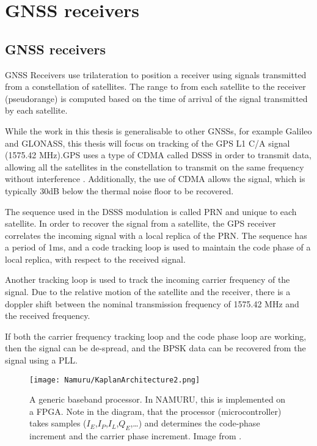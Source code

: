 \chapter{GNSS receivers}\label{ch:GNSSReceivers}

\section{\ac{GNSS} receivers}

\ac{GNSS} Receivers use trilateration to position a receiver using signals transmitted from a constellation of satellites. The range to from each satellite to the receiver (pseudorange) is computed based on the time of arrival of the signal transmitted by each satellite. 

While the work in this thesis is generalisable to other \ac{GNSS}s, for example Galileo and GLONASS, this thesis will focus on tracking of the GPS L1 \ac{C/A} signal (1575.42 MHz).\ac{GPS} uses a type of \ac{CDMA} called \ac{DSSS} in order to transmit data, allowing all the satellites in the constellation to transmit on the same frequency without interference \cite{Ublox}. Additionally, the use of \ac{CDMA} allows the signal, which is typically 30dB below the thermal noise floor to be recovered\cite{Gleason,Tsui}.

The sequence used in the \ac{DSSS} modulation is called \ac{PRN} and unique to each satellite. In order to recover the signal from a satellite, the GPS receiver correlates the incoming signal with a local replica of the \ac{PRN}. The sequence has a period of 1ms, and a code tracking loop is used to maintain the code phase of a local replica, with respect to the received signal. 

Another tracking loop is used to track the incoming carrier frequency of the signal. Due to the relative motion of the satellite and the receiver, there is a doppler shift between the nominal transmission frequency of 1575.42 MHz and the received frequency. 

If both the carrier frequency tracking loop and the code phase loop are working, then the signal can be de-spread, and the \ac{BPSK} data can be recovered from the signal using a \ac{PLL}.


\begin{figure}[!htb] 
    \centering
    \texttt{[image: Namuru/KaplanArchitecture2.png]} 
    \caption{A generic baseband processor. In \ac{NAMURU}, this is implemented on a \ac{FPGA}. Note in the diagram, that the processor (microcontroller) takes samples ($I_E$,$I_P$,$I_L$,$Q_E$,\ldots) and determines the code-phase increment and the carrier phase increment. Image from \cite{Kaplan}.}
    \label{fig:KaplanArchitecture}
\end{figure}

